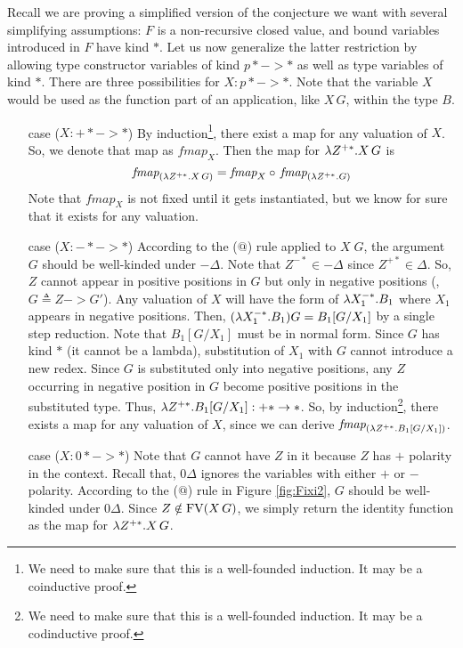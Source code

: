 Recall we are proving a simplified version of the conjecture we want with
several simplifying assumptions: $F$ is a non-recursive closed value, and
bound variables introduced in $F$ have kind $*$. Let us now generalize
the latter restriction by allowing type constructor variables of kind $p* -> *$
as well as type variables of kind $*$. There are three possibilities for
$X:p* -> *$. Note that the variable $X$ would be used as the function part of
an application, like $X\,G$, within the type $B$.
\begin{itemize}
\item[case]($X : +* -> *$)
        By induction\footnote{
                We need to make sure that this is a well-founded induction.
                It may be a coinductive proof.},
        there exist a map for any valuation of $X$.
        So, we denote that map as $\textit{fmap}_{X}$.
        Then the map for $\lambda Z^{+*}.X\,G$ is
        \[ \textit{fmap}_{(\lambda Z^{+*}.X\,G)} =
                \textit{fmap}_{X} \circ\, \textit{fmap}_{(\lambda Z^{+*}.G)} \]
        Note that $\textit{fmap}_{X}$ is not fixed until it gets
        instantiated, but we know for sure that it exists for any
        valuation.

\item[case]($X : -* -> *$)
        According to the ($@$) rule applied to $X\;G$, the argument $G$ should be well-kinded under $-\Delta$.
        Note that $Z^{-*}\in-\Delta$ since $Z^{+*}\in \Delta$.
        So, $Z$ cannot appear in positive positions in $G$ but only in
        negative positions (\eg, $G \triangleq Z -> G'$).
        Any valuation of $X$ will have the form of $\lambda X_1^{-*}.B_1$
        where $X_1$ appears in negative positions.
        Then, $(\lambda X_1^{-*}.B_1)G = B_1[G/X_1]$ by a single step reduction.
        Note that $B_1[G/X_1]$ must be in normal form. Since $G$ has kind $*$
        (it cannot be a lambda), substitution of $X_1$ with $G$ cannot
        introduce a new redex. Since $G$ is substituted only into
        negative positions, any $Z$ occurring in negative position in $G$
        become positive positions in the substituted type.
        Thus, $\lambda Z^{+*}.B_1[G/X_1] : +* -> *$.
        So, by induction\footnote{
                We need to make sure that this is a well-founded induction.
                It may be a codinductive proof.},
        there exists a map for any valuation of $X$,
        since we can derive $\textit{fmap}_{(\lambda Z^{+*}.B_1[G/X_1])}$.

\item[case]($X : 0* -> *$)
        Note that $G$ cannot have $Z$ in it because $Z$ has $+$ polarity
        in the context. Recall that, $0\Delta$ ignores the variables
        with either $+$ or $-$ polarity. According to the ($@$) rule
        in Figure \ref{fig:Fixi2}, $G$ should be well-kinded under $0\Delta$.
        Since $Z\notin\mathop{\mathrm{FV}}(X\,G)$, we simply return the identity function
        as the map for $\lambda Z^{+*}.X\,G$.
\end{itemize}
